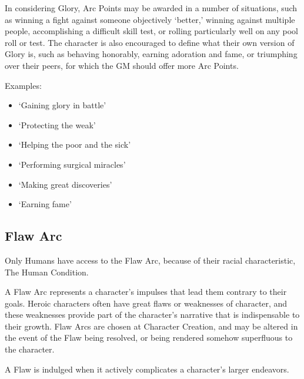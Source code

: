 \documentclass[oneside,11pt,english]{book}
\begin{document}
 
In considering Glory, Arc Points may be awarded in a number of situations, such as winning a fight 
against someone objectively ‘better,’ winning against multiple people, accomplishing a difficult skill test, 
or rolling particularly well on any pool roll or test. The character is also encouraged to define what their 
own version of Glory is, such as behaving honorably, earning adoration and fame, or triumphing over 
their peers, for which the GM should offer more Arc Points. 

 

Examples: 
\begin{itemize}
\item ‘Gaining glory in battle’ 
\item ‘Protecting the weak’ 
\item ‘Helping the poor and the sick’ 
\item ‘Performing surgical miracles’ 
\item ‘Making great discoveries’ 
\item ‘Earning fame’ 
\end{itemize}
 

\subsection{Flaw Arc} 
Only Humans have access to the Flaw Arc, because of their racial characteristic, The Human Condition. 

A Flaw Arc represents a character’s impulses that lead them contrary to their goals. Heroic characters 
often have great flaws or weaknesses of character, and these weaknesses provide part of the character’s 
narrative that is indispensable to their growth. Flaw Arcs are chosen at Character Creation, and may be 
altered in the event of the Flaw being resolved, or being rendered somehow superfluous to the character. 

A Flaw is indulged when it actively complicates a character’s larger endeavors. 
\end{document}

